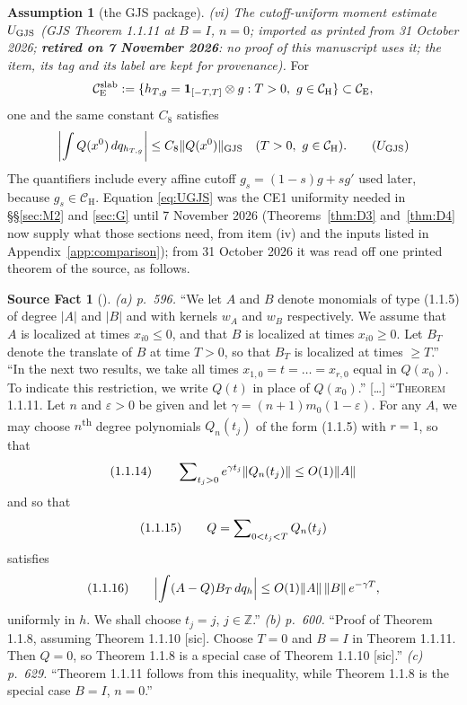 \documentclass[11pt,a4paper]{article}
\theoremstyle{plain}
\theoremstyle{definition}
\newtheorem*{srcfactstar}{Source Fact}
\newtheorem{assumption}{Assumption}
\theoremstyle{plain}
\theoremstyle{definition}
\newcommand{\CE}{\mathcal{C}_{\mathrm E}}
\newcommand{\CH}{\mathcal{C}_{\mathrm H}}
\begin{document}
\begin{assumption}[the GJS package]
\emph{(vi) The cutoff-uniform moment estimate $U_{\rm GJS}$ (GJS Theorem 1.1.11 at
$B=I$, $n=0$; imported as printed from 31 October 2026; \textbf{retired on 7 November
2026}: no proof of this manuscript uses it; the item, its tag and its label are kept for
provenance).}
For
\[
 \CE^{\rm slab}:=
 \{h_{T,g}=\mathbf1_{[-T,T]}\otimes g:T>0,\ g\in\CH\}\subset\CE,
\]
one and the same constant $C_8$ satisfies
\begin{equation}
 \left|\int Q(x^0)\,dq_{h_{T,g}}\right|
 \le C_8\|Q(x^0)\|_{\rm GJS}
 \quad(T>0,\ g\in\CH) .
 \tag{$U_{\rm GJS}$}\label{eq:UGJS}
\end{equation}
The quantifiers include every affine cutoff
$g_s=(1-s)g+sg'$ used later, because $g_s\in\CH$.  Equation
\eqref{eq:UGJS} was the CE1 uniformity needed in \S\S\ref{sec:M2} and \ref{sec:G} until
7 November 2026 (Theorems~\ref{thm:D3} and~\ref{thm:D4} now supply what those sections
need, from item (iv) and the inputs listed in Appendix~\ref{app:comparison}); from 31 October 2026 it was read off one printed theorem of the
source, as follows.
\begin{srcfactstar}[{\cite[pp.~596, 600 and 629]{GJS}}]
\emph{(a) p.~596.} ``We let $A$ and $B$ denote monomials of type (1.1.5) of degree $|A|$
and $|B|$ and with kernels $w_A$ and $w_B$ respectively. We assume that $A$ is localized at
times $x_{i0}\le0$, and that $B$ is localized at times $x_{i0}\ge0$. Let $B_T$ denote the
translate of $B$ at time $T>0$, so that $B_T$ is localized at times $\ge T$.''
``In the next two results, we take all times $x_{1,0}=t=\dots=x_{r,0}$ equal in $Q(x_0)$.
To indicate this restriction, we write $Q(t)$ in place of $Q(x_0)$.'' [\dots]
``\textsc{Theorem} 1.1.11. Let $n$ and $\varepsilon>0$ be given and let
$\gamma=(n+1)m_0(1-\varepsilon)$. For any $A$, we may choose $n$\textsuperscript{th} degree
polynomials $Q_n(t_j)$ of the form (1.1.5) with $r=1$, so that
\[
 \textup{(1.1.14)}\qquad \sum\nolimits_{t_j>0}e^{\gamma t_j}\|Q_n(t_j)\|\le O(1)\|A\|
\]
and so that
\[
 \textup{(1.1.15)}\qquad Q=\sum\nolimits_{0<t_j<T}Q_n(t_j)
\]
satisfies
\[
 \textup{(1.1.16)}\qquad \Bigl|\int(A-Q)B_T\,dq_h\Bigr|\le O(1)\|A\|\,\|B\|\,e^{-\gamma T} ,
\]
uniformly in $h$. We shall choose $t_j=j$, $j\in\mathbb Z$.''
\emph{(b) p.~600.} ``Proof of Theorem 1.1.8, assuming Theorem 1.1.10 [sic]. Choose $T=0$
and $B=I$ in Theorem 1.1.11. Then $Q=0$, so Theorem 1.1.8 is a special case of Theorem
1.1.10 [sic].''
\emph{(c) p.~629.} ``Theorem 1.1.11 follows from this inequality, while Theorem 1.1.8 is the
special case $B=I$, $n=0$.''
\end{srcfactstar}


\end{assumption}
\end{document}
